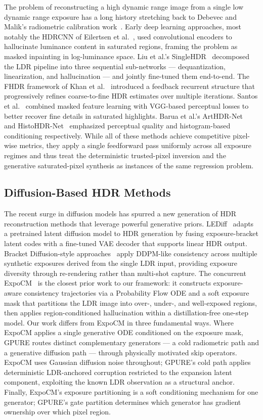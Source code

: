 \documentclass[10pt,twocolumn,letterpaper]{article}
\begin{document}
The problem of reconstructing a high dynamic range image from a single low dynamic range exposure has a long history stretching back to Debevec and Malik's radiometric calibration work~\cite{debevec1997}. Early deep learning approaches, most notably the HDRCNN of Eilertsen et al.~\cite{hdrcnn}, used convolutional encoders to hallucinate luminance content in saturated regions, framing the problem as masked inpainting in log-luminance space. Liu et al.'s SingleHDR~\cite{singlehdr} decomposed the LDR pipeline into three sequential sub-networks --- dequantization, linearization, and hallucination --- and jointly fine-tuned them end-to-end. The FHDR framework of Khan et al.~\cite{fhdr} introduced a feedback recurrent structure that progressively refines coarse-to-fine HDR estimates over multiple iterations. Santos et al.~\cite{santos2020} combined masked feature learning with VGG-based perceptual losses to better recover fine details in saturated highlights. Barua et al.'s ArtHDR-Net~\cite{arthdr} and HistoHDR-Net~\cite{histohdr} emphasized perceptual quality and histogram-based conditioning respectively. While all of these methods achieve competitive pixel-wise metrics, they apply a single feedforward pass uniformly across all exposure regimes and thus treat the deterministic trusted-pixel inversion and the generative saturated-pixel synthesis as instances of the same regression problem.

\subsection{Diffusion-Based HDR Methods}

The recent surge in diffusion models has spurred a new generation of HDR reconstruction methods that leverage powerful generative priors. LEDiff~\cite{lediff} adapts a pretrained latent diffusion model to HDR generation by fusing exposure-bracket latent codes with a fine-tuned VAE decoder that supports linear HDR output. Bracket Diffusion-style approaches~\cite{exposurediffusion} apply DDPM-like consistency across multiple synthetic exposures derived from the single LDR input, providing exposure diversity through re-rendering rather than multi-shot capture. The concurrent ExpoCM~\cite{expocm} is the closest prior work to our framework: it constructs exposure-aware consistency trajectories via a Probability Flow ODE and a soft exposure mask that partitions the LDR image into over-, under-, and well-exposed regions, then applies region-conditioned hallucination within a distillation-free one-step model. Our work differs from ExpoCM in three fundamental ways. Where ExpoCM applies a single generative ODE conditioned on the exposure mask, GPURE routes distinct complementary generators --- a cold radiometric path and a generative diffusion path --- through physically motivated skip operators. ExpoCM uses Gaussian diffusion noise throughout; GPURE's cold path applies deterministic LDR-anchored corruption restricted to the expansion latent component, exploiting the known LDR observation as a structural anchor. Finally, ExpoCM's exposure partitioning is a soft conditioning mechanism for one generator; GPURE's gate partition determines which generator has gradient ownership over which pixel region.
\end{document}
